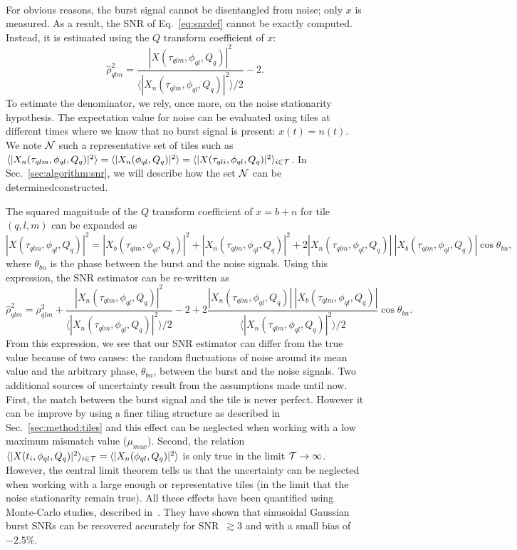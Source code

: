 ~

For obvious reasons, the burst signal cannot be disentangled from noise; only $x$ is measured. As a result, the SNR of Eq.~\ref{eq:snrdef} cannot be exactly computed. Instead, it is estimated using the $Q$ transform coefficient of $x$:
\begin{equation}
  \hat{\rho}_{qlm}^2 =  \frac{|X(\tau_{qlm}, \phi_{ql}, Q_q)|^2}{\langle |X_n(\tau_{qlm}, \phi_{ql}, Q_q)|^2 \rangle/2}-2 . \label{eq:snrestimator}
\end{equation}
To estimate the denominator, we rely, once more, on the noise stationarity hypothesis. The expectation value for noise can be evaluated using tiles at different times where we know that no burst signal is present: $x(t)=n(t)$. We note $\cal{N}$ such a representative set of tiles such as $\langle |X_n(\tau_{qlm}, \phi_{ql}, Q_q)|^2 \rangle = \langle |X_n(\phi_{ql}, Q_q)|^2 \rangle = \langle |X(\tau_{qli}, \phi_{ql}, Q_q)|^2 \rangle_{i\in \cal{T}}$. In Sec.~\ref{sec:algorithm:snr}, we will describe how the set $\cal{N}$ can be determinedconstructed.

The squared magnitude of the $Q$ transform coefficient of $x=b+n$ for tile $(q,l,m)$ can be expanded as
\begin{equation}
  |X(\tau_{qlm}, \phi_{ql}, Q_q)|^2 = |X_b(\tau_{qlm}, \phi_{ql}, Q_q)|^2 + |X_n(\tau_{qlm}, \phi_{ql}, Q_q)|^2 + 2|X_n(\tau_{qlm}, \phi_{ql}, Q_q)|\ |X_b(\tau_{qlm}, \phi_{ql}, Q_q)|\cos{\theta_{bn}},
\end{equation}
where $\theta_{bn}$ is the phase between the burst and the noise signals. Using this expression, the SNR estimator can be re-written as
\begin{equation}
  \hat{\rho}_{qlm}^2  =
  \rho_{qlm}^2
  + \frac{|X_n(\tau_{qlm}, \phi_{ql}, Q_q)|^2}{\langle |X_n(\tau_{qlm}, \phi_{ql}, Q_q)|^2 \rangle/2} -2
  + 2\frac{|X_n(\tau_{qlm}, \phi_{ql}, Q_q)|\ |X_b(\tau_{qlm}, \phi_{ql}, Q_q)|}{\langle |X_n(\tau_{qlm}, \phi_{ql}, Q_q)|^2 \rangle/2}\cos{\theta_{bn}}.
\end{equation}
From this expression, we see that our SNR estimator can differ from the true value because of two causes: the random fluctuations of noise around its mean value and the arbitrary phase, $\theta_{bn}$, between the burst and the noise signals. Two additional sources of uncertainty result from the assumptions made until now. First, the match between the burst signal and the tile is never perfect. However it can be improve by using a finer tiling structure as described in Sec.~\ref{sec:method:tiles} and this effect can be neglected when working with a low maximum mismatch value ($\mu_{max}$). Second, the relation $\langle |X(t_i, \phi_{ql}, Q_q)|^2 \rangle_{i\in \cal{T}}=\langle |X_n(\phi_{ql}, Q_q)|^2 \rangle$ is only true in the limit $\cal{T}\rightarrow \infty$. However, the central limit theorem tells us that the uncertainty can be neglected when working with a large enough or representative tiles (in the limit that the noise stationarity remain true). All these effects have been quantified using Monte-Carlo studies, described in~\cite{Chatterji:2004}. They have shown that sinusoidal Gaussian burst SNRs can be recovered accurately for SNR~$\gtrsim 3$ and with a small bias of $-2.5\%$.




